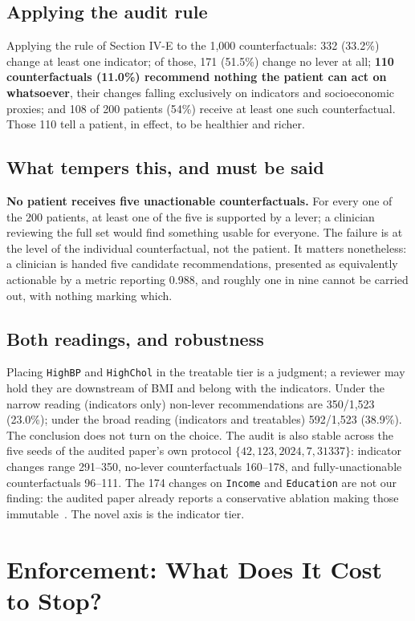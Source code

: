 \documentclass[conference]{IEEEtran}
\begin{document}
\subsection{Applying the audit rule}
Applying the rule of Section IV-E to the 1{,}000 counterfactuals: 332 (33.2\%) change at least one indicator; of those, 171 (51.5\%) change no lever at all; \textbf{110 counterfactuals (11.0\%) recommend nothing the patient can act on whatsoever}, their changes falling exclusively on indicators and socioeconomic proxies; and 108 of 200 patients (54\%) receive at least one such counterfactual. Those 110 tell a patient, in effect, to be healthier and richer.

\subsection{What tempers this, and must be said}
\textbf{No patient receives five unactionable counterfactuals.} For every one of the 200 patients, at least one of the five is supported by a lever; a clinician reviewing the full set would find something usable for everyone. The failure is at the level of the individual counterfactual, not the patient. It matters nonetheless: a clinician is handed five candidate recommendations, presented as equivalently actionable by a metric reporting 0.988, and roughly one in nine cannot be carried out, with nothing marking which.

\subsection{Both readings, and robustness}
Placing \texttt{HighBP} and \texttt{HighChol} in the treatable tier is a judgment; a reviewer may hold they are downstream of BMI and belong with the indicators. Under the narrow reading (indicators only) non-lever recommendations are 350/1{,}523 (23.0\%); under the broad reading (indicators and treatables) 592/1{,}523 (38.9\%). The conclusion does not turn on the choice. The audit is also stable across the five seeds of the audited paper's own protocol $\{42, 123, 2024, 7, 31337\}$: indicator changes range 291--350, no-lever counterfactuals 160--178, and fully-unactionable counterfactuals 96--111. The 174 changes on \texttt{Income} and \texttt{Education} are not our finding: the audited paper already reports a conservative ablation making those immutable~\cite{thieu2026}. The novel axis is the indicator tier.

\section{Enforcement: What Does It Cost to Stop?}
\end{document}
